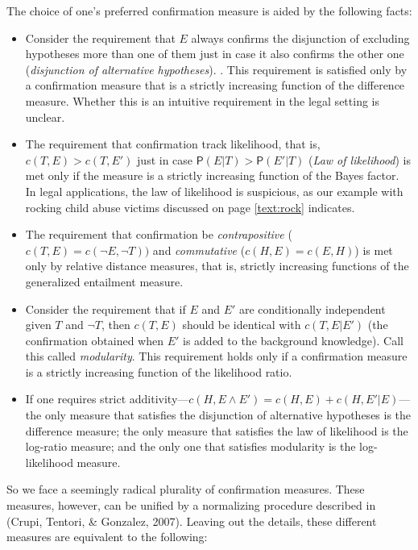 \documentclass[
  10pt,
  dvipsnames,enabledeprecatedfontcommands]{scrartcl}
\newcommand{\raf}[1]{\todo[color=olive!40]{#1}}
\newcommand{\n}{\neg}
\newcommand{\et}{\wedge}
\newcommand{\pr}[1]{\mathsf{P}(#1)}
\begin{document}
The choice of one's preferred confirmation measure is aided by the
following facts:

\begin{itemize}
\item
  Consider the requirement that \(E\) always confirms the disjunction of
  excluding hypotheses more than one of them just in case it also
  confirms the other one (\emph{disjunction of alternative hypotheses}).
  \raf{M: This is not clear. What does that mean?}. This requirement is
  satisfied only by a confirmation measure that is a strictly increasing
  function of the difference measure. Whether this is an intuitive
  requirement in the legal setting is unclear.
\item
  The requirement that confirmation track likelihood, that is,
  \(c(T,E) > c(T,E')\) just in case \(\pr{E\vert T} > \pr{E'\vert T}\)
  (\emph{Law of likelihood}) is met only if the measure is a strictly
  increasing function of the Bayes factor. In legal applications, the
  law of likelihood is suspicious, as our example with rocking child
  abuse victims discussed on page \ref{text:rock} indicates.
\item
  The requirement that confirmation be \emph{contrapositive}
  (\(c(T,E) = c(\n E, \n T))\) and \emph{commutative}
  (\(c(H,E) = c(E,H)\)) is met only by relative distance measures, that
  is, strictly increasing functions of the generalized entailment
  measure.
\item
  Consider the requirement that if \(E\) and \(E'\) are conditionally
  independent given \(T\) and \(\neg T\), then \(c(T,E)\) should be
  identical with \(c(T,E\vert E')\) (the confirmation obtained when
  \(E'\) is added to the background knowledge). Call this called
  \emph{modularity}. This requirement holds only if a confirmation
  measure is a strictly increasing function of the likelihood ratio.
\item
  If one requires strict
  additivity---\(c(H, E\et E') = c(H, E) + c(H, E'\vert E)\)---the only
  measure that satisfies the disjunction of alternative hypotheses is
  the difference measure; the only measure that satisfies the law of
  likelihood is the log-ratio measure; and the only one that satisfies
  modularity is the log-likelihood measure.
\end{itemize}

So we face a seemingly radical plurality of confirmation measures. These
measures, however, can be unified by a normalizing procedure described
in (Crupi, Tentori, \& Gonzalez, 2007). Leaving out the details, these
different measures are equivalent to the following:
\end{document}
